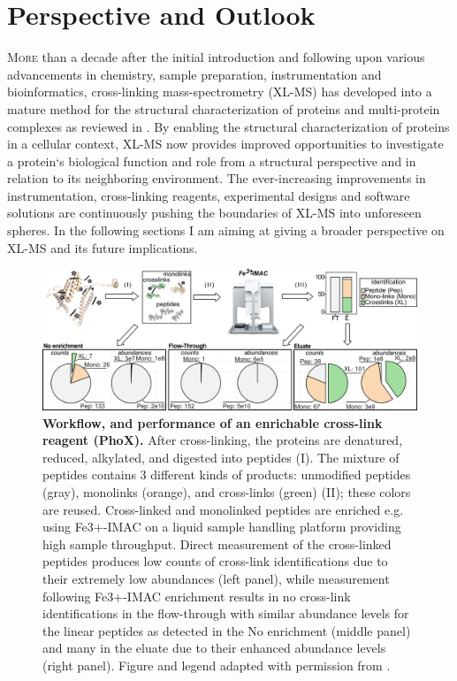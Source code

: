  \label{ch-6}
\newpage
\section{Perspective and Outlook}
\lettrine[lraise=0.1, nindent=0em, slope=-.5em]{M}{ore} than a decade after the initial introduction and following upon various advancements in chemistry, sample preparation, instrumentation and bioinformatics, cross-linking mass-spectrometry (XL-MS) has developed into a mature method for the structural characterization of proteins and multi-protein complexes as reviewed in \cite{RN8, RN7, RN6}. By enabling the structural characterization of proteins in a cellular context, XL-MS now provides improved opportunities to investigate a protein`s biological function and role from a structural perspective and in relation to its neighboring environment. The ever-increasing improvements in instrumentation, cross-linking reagents, experimental designs and software solutions are continuously pushing the boundaries of XL-MS into unforeseen spheres. In the following sections I am aiming at giving a broader perspective on XL-MS and its future implications.
\begin{figure}[hbt!]
    \center
    \includegraphics[width=\textwidth]{Chapter.6/Figures/Figure2.png}
    \caption{\textbf{Workflow, and performance of an enrichable cross-link reagent (PhoX).} After cross-linking, the proteins are denatured, reduced, alkylated, and digested into peptides (I). The mixture of peptides contains 3 different kinds of products: unmodified peptides (gray), monolinks (orange), and cross-links (green) (II); these colors are reused. Cross-linked and monolinked peptides are enriched e.g. using Fe3+-IMAC on a liquid sample handling platform providing high sample throughput. Direct measurement of the cross-linked peptides produces low counts of cross-link identifications due to their extremely low abundances (left panel), while measurement following Fe3+-IMAC enrichment results in no cross-link identifications in the flow-through with similar abundance levels for the linear peptides as detected in the No enrichment (middle panel) and many in the eluate due to their enhanced abundance levels (right panel). Figure and legend adapted with permission from \cite{RN4}.}
    \label{fig:ch6_fig2}
\end{figure}
